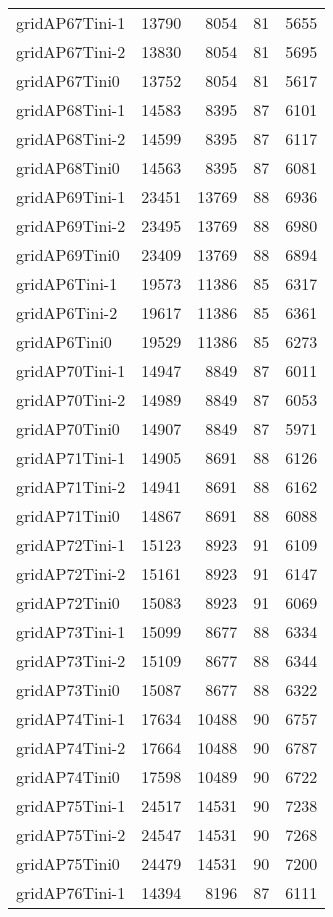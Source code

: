 \begin{longtable}{lrrrr}
gridAP67Tini-1 & 13790 & 8054 & 81 & 5655 \\
gridAP67Tini-2 & 13830 & 8054 & 81 & 5695 \\
gridAP67Tini0 & 13752 & 8054 & 81 & 5617 \\
gridAP68Tini-1 & 14583 & 8395 & 87 & 6101 \\
gridAP68Tini-2 & 14599 & 8395 & 87 & 6117 \\
gridAP68Tini0 & 14563 & 8395 & 87 & 6081 \\
gridAP69Tini-1 & 23451 & 13769 & 88 & 6936 \\
gridAP69Tini-2 & 23495 & 13769 & 88 & 6980 \\
gridAP69Tini0 & 23409 & 13769 & 88 & 6894 \\
gridAP6Tini-1 & 19573 & 11386 & 85 & 6317 \\
gridAP6Tini-2 & 19617 & 11386 & 85 & 6361 \\
gridAP6Tini0 & 19529 & 11386 & 85 & 6273 \\
gridAP70Tini-1 & 14947 & 8849 & 87 & 6011 \\
gridAP70Tini-2 & 14989 & 8849 & 87 & 6053 \\
gridAP70Tini0 & 14907 & 8849 & 87 & 5971 \\
gridAP71Tini-1 & 14905 & 8691 & 88 & 6126 \\
gridAP71Tini-2 & 14941 & 8691 & 88 & 6162 \\
gridAP71Tini0 & 14867 & 8691 & 88 & 6088 \\
gridAP72Tini-1 & 15123 & 8923 & 91 & 6109 \\
gridAP72Tini-2 & 15161 & 8923 & 91 & 6147 \\
gridAP72Tini0 & 15083 & 8923 & 91 & 6069 \\
gridAP73Tini-1 & 15099 & 8677 & 88 & 6334 \\
gridAP73Tini-2 & 15109 & 8677 & 88 & 6344 \\
gridAP73Tini0 & 15087 & 8677 & 88 & 6322 \\
gridAP74Tini-1 & 17634 & 10488 & 90 & 6757 \\
gridAP74Tini-2 & 17664 & 10488 & 90 & 6787 \\
gridAP74Tini0 & 17598 & 10489 & 90 & 6722 \\
gridAP75Tini-1 & 24517 & 14531 & 90 & 7238 \\
gridAP75Tini-2 & 24547 & 14531 & 90 & 7268 \\
gridAP75Tini0 & 24479 & 14531 & 90 & 7200 \\
gridAP76Tini-1 & 14394 & 8196 & 87 & 6111 \\

\end{longtable}
